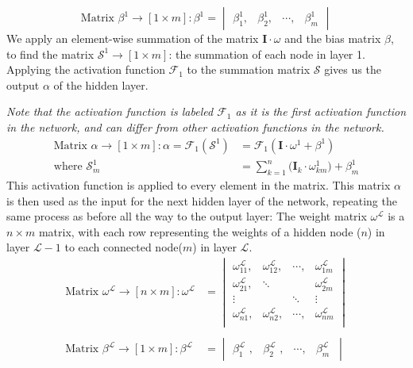 \documentclass{report}
\begin{document}
\begin{equation}
    \text{Matrix }\beta^{1}\rightarrow \left[1\times m\right] : \beta^{1}  = 
        \begin{vmatrix}
            \beta_{1}^{1} ,& \beta_{2}^{1} ,&\cdots, & \beta_{m}^{1}
        \end{vmatrix}
\end{equation}
\newline
We apply an element-wise summation of the matrix $\mathbf{I}\cdot\omega$ and the bias matrix $\beta$, to find the matrix $\mathcal{S}^1\rightarrow \left[1\times m \right]$: the summation of each node in layer 1.
Applying the activation function $\mathcal{F}_1$ to the summation matrix $\mathcal{S}$ gives us the output $\alpha$ of the hidden layer.

\textit{Note that the activation function is labeled $\mathcal{F}_1$ as it is the first activation function in the network, and can differ from other activation functions in the network.}
\begin{align}
    \text{Matrix }\alpha\rightarrow \left[1\times m\right] : \alpha  = 
    \mathcal{F}_1(\mathcal{S}^{1}) &= \mathcal{F}_1(\mathbf{I}\cdot\omega^{1} + \beta^{1})\\
    \text{where }\mathcal{S}^1_m &= \sum_{k=1}^{n} \Big(\mathbf{I}_k\cdot\omega_{km}^{1}\Big) + \beta_{m}^{1}
\end{align}
This activation function is applied to every element in the matrix.
This matrix $\alpha$ is then used as the input for the next hidden layer of the network, repeating the same process as before all the way to the output layer:
\newline
The weight matrix $\omega^{\mathcal{L}}$ is a $n\times m$ matrix, with each row representing the weights of a hidden node ($n$) in layer $\mathcal{L}-1$ to each connected node($m$) in layer $\mathcal{L}$.
\begin{align}
    \text{Matrix }\omega^{\mathcal{L}}\rightarrow \left[n\times m\right] : \omega^{\mathcal{L}} &= 
        \begin{vmatrix}
        \omega_{11}^{\mathcal{L}} ,& \omega_{12}^{\mathcal{L}} ,&\cdots, & \omega_{1m}^{\mathcal{L}} \\
        \omega_{21}^{\mathcal{L}} ,& \ddots & & \omega_{2m}^{\mathcal{L}} \\
        \vdots  & &\ddots & \vdots  \\
        \omega_{n1}^{\mathcal{L}} ,& \omega_{n2}^{\mathcal{L}} ,&\cdots, & \omega_{nm}^{\mathcal{L}} \\
        \end{vmatrix}\\
        \\
        \text{Matrix }\beta^{\mathcal{L}}\rightarrow \left[1\times m\right] : \beta^{\mathcal{L}}  &= 
        \begin{vmatrix}
            \beta_{1}^{\mathcal{L}} \hspace{4pt},& \beta_{2}^{\mathcal{L}}\hspace{4pt} ,&\cdots, & \beta_{m}^{\mathcal{L}\hspace{4pt}}
        \end{vmatrix}
\end{align}
\end{document}
